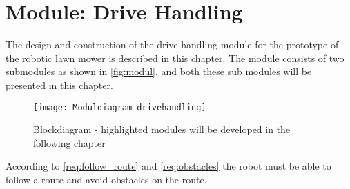 \graphicspath{{figures/design/drivehandling/}}
\chapter{Module: Drive Handling}\label{ch:drivehandling}
The design and construction of the drive handling module for the prototype of the robotic lawn mower is described in this chapter. The module consists of two submodules as shown in \autoref{fig:modul}, and both these sub modules will be presented in this chapter. 
\begin{figure}[h]%
	\centering
	\texttt{[image: Moduldiagram-drivehandling]}%
	\caption{Blockdiagram - highlighted modules will be developed in the following chapter}%
	\label{fig:modul}%
\end{figure}

According to \autoref{req:follow_route} and \autoref{req:obstacles} the robot  must be able to follow a route and avoid obstacles on the route.





